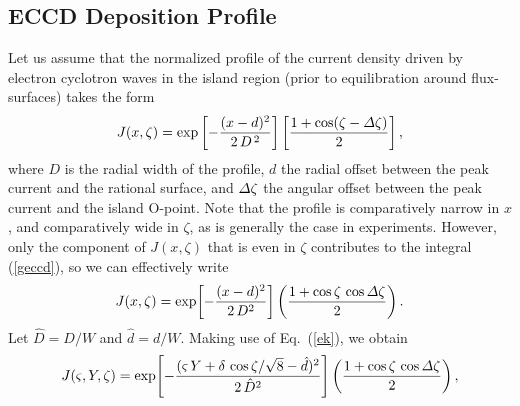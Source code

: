 \documentclass[12pt,prb,aps]{revtex4-1}
\begin{document}
 \subsection{ECCD Deposition Profile}
 Let us assume that the normalized profile of the current density driven by electron cyclotron waves in the island region (prior
 to equilibration around flux-surfaces) takes the form
 \begin{equation}
 J(x,\zeta) = \exp\left[-\frac{(x-d)^2}{2\,D^{\,2}}\right]\left[\frac{1+\cos(\zeta-{\mit\Delta}\zeta)}{2}\right],
 \end{equation}
 where $D$ is the radial width of the profile, $d$  the radial offset between the peak current and the rational surface, and
${\mit\Delta}\zeta$ the angular offset between the peak current and the island O-point. Note that the profile is  comparatively narrow in $x$, and comparatively
wide in $\zeta$, as is  generally the case in experiments. However, only the component of $J(x,\zeta)$ that is even in $\zeta$ contributes to the integral (\ref{geccd}), so we can effectively write
\begin{equation}
J(x,\zeta)= \exp\!\left[-\frac{(x-d)^2}{2\,D^2}\right]\left(\frac{1+\cos\zeta\,\cos{\mit\Delta}\zeta}{2}\right).
\end{equation}
Let $\hat{D}=D/W$ and $\hat{d}=d/W$. Making use of Eq.~(\ref{ek}), we obtain 
\begin{equation}
J(\varsigma,Y,\zeta) =  \exp\!\left[-\frac{(\varsigma\,Y+\delta\,\cos\zeta/\sqrt{8}-\hat{d})^2}{2\,\hat{D}^2}\right]\left(\frac{1+\cos\zeta\,\cos{\mit\Delta}\zeta}{2}\right),
\end{equation}
\end{document}
